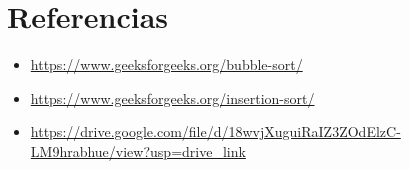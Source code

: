 \documentclass{article}
\begin{document}
	\clearpage
	
	\section{Referencias}
	\begin{itemize}			
		\item \url{https://www.geeksforgeeks.org/bubble-sort/}
		\item \url{https://www.geeksforgeeks.org/insertion-sort/}
		\item \url{https://drive.google.com/file/d/18wvjXuguiRaIZ3ZOdElzC-LM9hrabhue/view?usp=drive_link}
		
	\end{itemize}	
	
	
\end{document}
